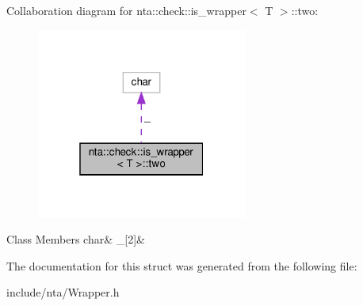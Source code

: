 Collaboration diagram for nta\+:\+:check\+:\+:is\+\_\+wrapper$<$ T $>$\+:\+:two\+:
\nopagebreak
\begin{figure}[H]
\begin{center}
\leavevmode
\includegraphics[width=196pt]{d1/d80/structnta_1_1check_1_1is__wrapper_1_1two__coll__graph}
\end{center}
\end{figure}
\begin{DoxyFields}{Class Members}
\mbox{\label{structnta_1_1check_1_1is__wrapper_ac11466d0153a8e539984bd732c9dc9c9}} 
char&
\_\mbox{[}2\mbox{]}&
\\
\hline

\end{DoxyFields}


The documentation for this struct was generated from the following file\+:\begin{DoxyCompactItemize}
\item 
include/nta/Wrapper.\+h\end{DoxyCompactItemize}

